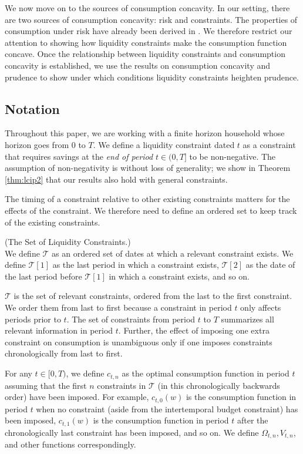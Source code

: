 
We now move on to the sources of consumption concavity. In our setting, there are two sources of consumption concavity: risk and constraints. The properties of consumption under risk have already been derived in \citet{carroll&kimball:concavity}. We therefore restrict our attention to showing how liquidity constraints make the consumption function concave. Once the relationship between liquidity constraints and consumption concavity is established, we use the results on consumption concavity and prudence to show under which conditions liquidity constraints heighten prudence.

\subsection{Notation}
Throughout this paper, we are working with a finite horizon household whose horizon goes from $0$ to $T$. We define a liquidity constraint dated $t$ as a constraint that requires savings at the \textit{end of period} $t \in (0, T]$ to be non-negative. The assumption of non-negativity is without loss of generality; we show in Theorem \ref{thm:lcip2} that our results also hold with general constraints.

The timing of a constraint relative to other existing constraints matters for the effects of the constraint. We therefore need to define an ordered set to keep track of the existing constraints.
\begin{defn} (The Set of Liquidity Constraints.) \\
	We define $\mathcal{T}$ as an ordered set of dates at which a relevant constraint exists. We define $\mathcal{T}[1]$ as the last period in which a constraint exists, $\mathcal{T}[2]$ as the date of the last period before $\mathcal{T}[1]$ in which a constraint exists, and so on.
\end{defn}
$\mathcal{T}$ is the set of relevant constraints, ordered from the last to the first constraint. We order them from last to first because a constraint in period $t$ only affects periods prior to $t$. The set of constraints from period $t$ to $T$ summarizes all relevant information in period $t$. Further, the effect of imposing one extra constraint on consumption is unambiguous only if one imposes constraints chronologically from last to first.

For any $t \in [0, T)$, we define $c_{t,n}$ as the optimal consumption function in period $t$ assuming that the first $n$ constraints in $\mathcal{T}$ (in this chronologically backwards order) have been imposed. For example, $c_{t,0}(w)$ is the consumption function in period $t$ when no constraint (aside from the intertemporal budget constraint) has been imposed, $c_{t,1}(w)$ is the consumption function in period $t$ after the chronologically last constraint has been imposed, and so on. We define $\Omega_{t,n}, V_{t,n}$, and other functions correspondingly.

